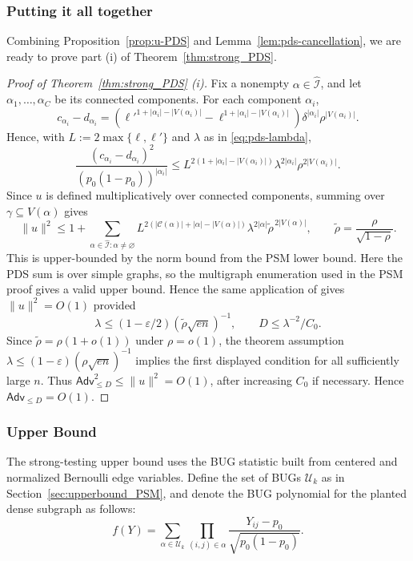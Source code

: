 \documentclass[11pt, letterpaper]{article}
\numberwithin{equation}{section}
\newcommand{\Adv}{\mathsf{Adv}}
\newcommand{\goodI}{\widehat{\mathcal{I}}}
\begin{document}
\subsubsection*{Putting it all together}
Combining Proposition~\ref{prop:u-PDS} and Lemma~\ref{lem:pds-cancellation}, we are ready to prove part (i) of Theorem~\ref{thm:strong_PDS}.
\begin{proof}[Proof of Theorem~\ref{thm:strong_PDS} \textnormal{(i)}]
Fix a nonempty $\alpha\in\goodI$, and let
$\alpha_1,\dots,\alpha_C$ be its connected components.
For each component $\alpha_i$,
\[
c_{\alpha_i}-d_{\alpha_i}=\left(\ell'^{1+|\alpha_i|-|V(\alpha_i)|}-
\ell^{1+|\alpha_i|-|V(\alpha_i)|}\right)\delta^{|\alpha_i|}\rho^{|V(\alpha_i)|}.
\]
Hence, with $L:=2\max\{\ell,\ell'\}$ and $\lambda$ as in \eqref{eq:pds-lambda},
\[\frac{(c_{\alpha_i}-d_{\alpha_i})^2}{(p_0(1-p_0))^{|\alpha_i|}}\le L^{2(1+|\alpha_i|-|V(\alpha_i)|)} \lambda^{2|\alpha_i|}\rho^{2|V(\alpha_i)|}.\]
Since $u$ is defined multiplicatively over connected components, summing over $\gamma\subseteq V(\alpha)$ gives
\[\|u\|^2\le 1+
\sum_{\alpha\in\widehat{\mathcal I}:\alpha\neq\varnothing}
L^{2(|\mathcal{C}(\alpha)|+|\alpha|-|V(\alpha)|)}\lambda^{2|\alpha|}\tilde\rho^{\,2|V(\alpha)|},
\qquad
\tilde\rho=\frac{\rho}{\sqrt{1-\rho}}.
\]
This is upper-bounded by the norm bound from the PSM lower bound. Here the PDS sum is over simple graphs, so the multigraph enumeration used in the PSM proof gives a valid upper bound. Hence the same application of
 gives $\|u\|^2=O(1)$ provided
\[
\lambda\le (1-\varepsilon/2)(\tilde\rho\sqrt{en})^{-1},
\qquad
D\le \lambda^{-2}/C_0.
\]
Since $\tilde\rho=\rho(1+o(1))$ under $\rho=o(1)$, the theorem assumption
$\lambda\le (1-\varepsilon)(\rho\sqrt{en})^{-1}$ implies the first displayed
condition for all sufficiently large $n$. Thus
$\Adv_{\le D}^2\le \|u\|^2=O(1)$, after increasing
$C_0$ if necessary. Hence $\Adv_{\le D}=O(1)$.
\end{proof}


\subsubsection{Upper Bound}\label{sec:PDS:upper-bound-strong}
The strong-testing upper bound uses the BUG statistic built from centered and
normalized Bernoulli edge variables. Define the set of BUGs $\mathcal U_k$ as in Section~\ref{sec:upperbound_PSM}, and denote the BUG polynomial for the planted dense subgraph as follows:
\begin{equation}\label{def:BUG_f_PDS}
    f(Y)=\sum_{\alpha \in \mathcal U_k}\prod_{(i,j)\in \alpha}\frac{Y_{ij}-p_0}{\sqrt{p_0(1-p_0)}}.
\end{equation}
\end{document}
